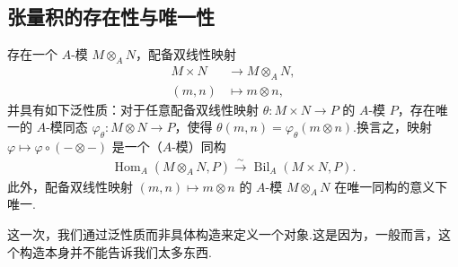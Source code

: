 \subsection{张量积的存在性与唯一性}\label{sec:galois-1-8-2}
\begin{theorem*}
存在一个 $A$-模 $M\otimes_A N$，配备双线性映射
\begin{align*}
M\times N&\longrightarrow M\otimes_A N,\\
(m,n)&\longmapsto m\otimes n,
\end{align*}
并具有如下泛性质：对于任意配备双线性映射 $\theta:M\times N\longrightarrow P$ 的 $A$-模 $P$，存在唯一的 $A$-模同态 $\varphi_\theta:M\otimes N\longrightarrow P$，使得 $\theta(m,n)=\varphi_\theta(m\otimes n)$.换言之，映射 $\varphi\mapsto\varphi\circ(-\otimes-)$ 是一个（$A$-模）同构
\begin{align*}
\operatorname{Hom}_A(M\otimes_A N,P)\xrightarrow{\sim}\operatorname{Bil}_A(M\times N,P).
\end{align*}
此外，配备双线性映射 $(m,n)\mapsto m\otimes n$ 的 $A$-模 $M\otimes_A N$ 在唯一同构的意义下唯一.
\end{theorem*}
\begin{remark*}
这一次，我们通过泛性质而非具体构造来定义一个对象.这是因为，一般而言，这个构造本身并不能告诉我们太多东西.
\end{remark*}

